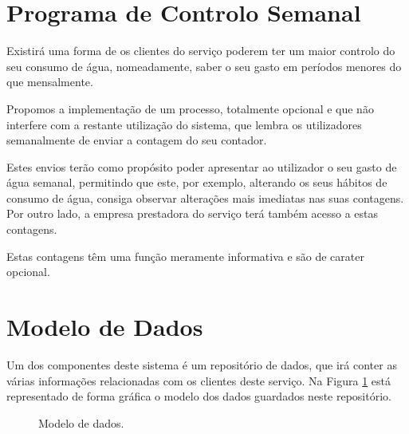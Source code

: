 \section{Programa de Controlo Semanal} \label{controlo}
Existirá uma forma de os clientes do serviço poderem ter um maior controlo do seu consumo de água, nomeadamente, saber o seu gasto em períodos menores do que mensalmente.\par
Propomos a implementação de um processo, totalmente opcional e que não interfere com a restante utilização do sistema, que lembra os utilizadores semanalmente de enviar a contagem do seu contador.\par
Estes envios terão como propósito poder apresentar ao utilizador o seu gasto de água semanal, permitindo que este, por exemplo, alterando os seus hábitos de consumo de água, consiga observar alterações mais imediatas nas suas contagens. Por outro lado, a empresa prestadora do serviço terá também acesso a estas contagens.\par
Estas contagens têm uma função meramente informativa e são de carater opcional.

\section{Modelo de Dados} \label{sec:dados}
Um dos componentes deste sistema é um repositório de dados, que irá conter as várias informações relacionadas com os clientes deste serviço. Na Figura \ref{fig:relacoes} está representado de forma gráfica o modelo dos dados guardados neste repositório.\par

\begin{figure}[ht!]
\centering
{}
\caption{Modelo de dados.}
\label{fig:relacoes}
\end{figure}

